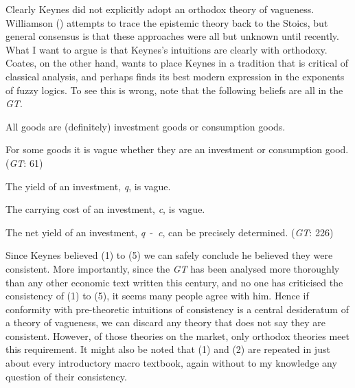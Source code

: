 \documentclass[
  10pt,
  letterpaper,
  DIV=11,
  numbers=noendperiod,
  twoside]{scrartcl}
\providecommand{\tightlist}{%
  \setlength{\itemsep}{0pt}\setlength{\parskip}{0pt}}\usepackage{longtable,booktabs,array}
\begin{document}
Clearly Keynes did not explicitly adopt an orthodox theory of vagueness.
Williamson () attempts to trace
the epistemic theory back to the Stoics, but general consensus is that
these approaches were all but unknown until recently. What I want to
argue is that Keynes's intuitions are clearly with orthodoxy. Coates, on
the other hand, wants to place Keynes in a tradition that is critical of
classical analysis, and perhaps finds its best modern expression in the
exponents of fuzzy logics. To see this is wrong, note that the following
beliefs are all in the \emph{GT}.

\begin{description}
\tightlist
\item[(1)]
All goods are (definitely) investment goods or consumption goods.
\item[(2)]
For some goods it is vague whether they are an investment or consumption
good. (\emph{GT}: 61)
\item[(3)]
The yield of an investment, \emph{q}, is vague.
\item[(4)]
The carrying cost of an investment, \emph{c}, is vague.
\item[(5)]
The net yield of an investment, \emph{q}~-~\emph{c}, can be precisely
determined. (\emph{GT}: 226)
\end{description}

Since Keynes believed (1) to (5) we can safely conclude he believed they
were consistent. More importantly, since the \emph{GT} has been analysed
more thoroughly than any other economic text written this century, and
no one has criticised the consistency of (1) to (5), it seems many
people agree with him. Hence if conformity with pre-theoretic intuitions
of consistency is a central desideratum of a theory of vagueness, we can
discard any theory that does not say they are consistent. However, of
those theories on the market, only orthodox theories meet this
requirement. It might also be noted that (1) and (2) are repeated in
just about every introductory macro textbook, again without to my
knowledge any question of their consistency.
\end{document}

